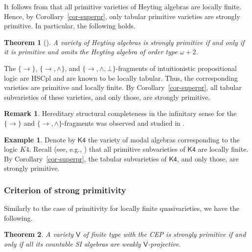 \documentclass[submission,copyright,creativecommons]{eptcs}
\newtheorem{theorem}{Theorem}[section]
\theoremstyle{definition}
\newtheorem{example}{Example}
\newtheorem{remark}{Remark}
\newcommand{\vv}[1]{\mathsf {#1}}
\begin{document}
It follows from \cite{Citkin1978} that all primitive varieties of Heyting algebras are locally finite. Hence, by Corollary~\ref{cor-superpr}, only tabular primitive varieties are strongly primitive. In particular, the following holds.

\begin{theorem}[{\cite[Section~4]{Citkin1978}}]
	A variety of Heyting algebras is strongly primitive if and only if it is primitive and omits the Heyting algebra of order type $\omega+2$.
\end{theorem}

The $\{\to\}$, $\{\to, \land\}$, and $\{\to,\land,\bot\}$-fragments of intuitionistic propositional logic are HSCpl and are known to be locally tabular. Thus, the corresponding varieties are primitive and locally finite. By Corollary~\ref{cor-superpr}, all tabular subvarieties of these varieties, and only those, are strongly primitive. 

\begin{remark}
	Hereditary structural completeness in the infinitary sense for the $\{\to\}$ and $\{\to, \land\}$-fragments was observed and studied in \cite{PrucnalStructural1983,PrucnalStructural1985,WojtylakSyntactical1990, WojtylakStructural1991}. 
\end{remark}

\begin{example}
	Denote by $\vv {K4}$ the variety of modal algebras corresponding to the logic $K4$. 
	Recall (see, e.g., \cite[Section~5]{RybakovBook}) that all primitive subvarieties of $\vv {K4}$ are locally finite. By Corollary~\ref{cor-superpr}, the tabular subvarieties of $\vv {K4}$, and only those, are strongly primitive.
\end{example}

\subsubsection*{Criterion of strong primitivity}
Similarly to the case of primitivity for locally finite quasivarieties, we have the following.

\begin{theorem}
	A variety $\vv V$ of finite type with the CEP is strongly primitive if and only if all its countable SI algebras are weakly $\vv V$-projective.
\end{theorem}
\end{document}

